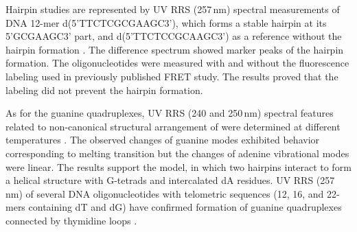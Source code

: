 Hairpin studies are represented by UV RRS (257\,nm) spectral measurements of
DNA 12-mer d(5'TTCTCGCGAAGC3'), which forms a stable hairpin at its
5'GCGAAGC3' part, and d(5'TTCTCCGCAAGC3') as a reference without the hairpin
formation
\parencite{Refregiers1997}.
The difference spectrum showed marker peaks of the hairpin formation.
The oligonucleotides were measured with and without the fluorescence labeling
used in previously published FRET study.
The results proved that the labeling did not prevent the hairpin formation.

As for the guanine quadruplexes, UV RRS (240 and 250\,nm) spectral features
related to non-canonical structural arrangement of  were
determined at different temperatures
\parencite{%
	Mukerji1995,%
	Mukerji1996%
}.
The observed changes of guanine modes exhibited behavior corresponding to
melting transition but the changes of adenine vibrational modes were linear.
The results support the model, in which two hairpins interact to form a helical
structure with G-tetrads and intercalated dA residues.
UV RRS (257\,nm) of several DNA oligonucleotides with telometric sequences (12,
16, and 22-mers containing dT and dG) have confirmed formation of guanine
quadruplexes connected by thymidine loops
\parencite{Krafft2002}.
